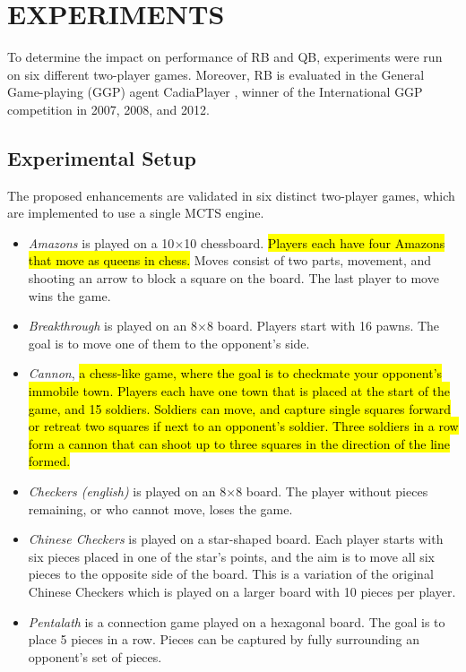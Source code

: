\documentclass{ecai2014}
\begin{document}
\section{EXPERIMENTS}
\label{sec:experiments}
To determine the impact on performance of RB and QB, experiments were run on six different two-player games. Moreover, RB is evaluated in the General Game-playing (GGP) agent {\sc CadiaPlayer} \cite{bjornsson2009cadiaplayer}, winner of the International GGP competition in 2007, 2008, and 2012.

\subsection{Experimental Setup}
\label{subsec:expsetup}
The proposed enhancements are validated in six distinct two-player games, which are implemented to use a single MCTS engine.

\begin{itemize}
\item \emph{Amazons} is played on a 10$\times$10 chessboard. \hl{Players each have four Amazons that move as queens in chess.} Moves consist of two parts, movement, and shooting an arrow to block a square on the board. The last player to move wins the game.
\item \emph{Breakthrough} is played on an 8$\times$8 board. Players start with 16 pawns. The goal is to move one of them to the opponent's side.
\item \emph{Cannon}, \hl{a chess-like game, where the goal is to checkmate your opponent's immobile town. Players each have one town that is placed at the start of the game, and 15 soldiers. Soldiers can move, and capture single squares forward or retreat two squares if next to an opponent's soldier. Three soldiers in a row form a cannon that can shoot up to three squares in the direction of the line formed.}
\item \emph{Checkers (english)} is played on an 8$\times$8 board. The player without pieces remaining, or who cannot move, loses the game.
\item \emph{Chinese Checkers} is played on a star-shaped board. Each player starts with six pieces placed in one of the star's points, and the aim is to move all six pieces to the opposite side of the board. This is a variation of the original Chinese Checkers which is played on a larger board with 10 pieces per player.
\item \emph{Pentalath} is a connection game played on a hexagonal board. The goal is to place 5 pieces in a row. Pieces can be captured by fully surrounding an opponent's set of pieces.
\end{itemize}
\end{document}
